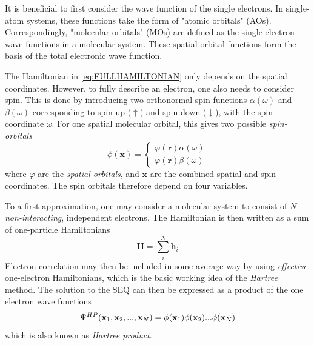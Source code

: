 It is beneficial to first consider the wave function of the single electrons. In single-atom systems, these functions take the form of "atomic orbitals" (AOs). Correspondingly, "molecular orbitals" (MOs) are defined as the single electron wave functions in a molecular system. These spatial orbital functions form the basis of the total electronic wave function.  

The Hamiltonian in \ref{eq:FULLHAMILTONIAN} only depends on the spatial coordinates. However, to fully describe an electron, one also needs to consider spin. This is done by introducing two orthonormal spin functions $\alpha(\omega)$ and $\beta(\omega)$ corresponding to spin-up ($\uparrow$) and spin-down ($\downarrow$), with the spin-coordinate $\omega$. For one spatial molecular orbital, this gives two possible \emph{spin-orbitals}
\begin{equation}
\phi(\mathbf{x}) = \left\lbrace\begin{matrix}
\varphi(\mathbf{r}) \alpha(\omega) \\
\varphi(\mathbf{r}) \beta(\omega)
\end{matrix} \right.
\end{equation}
\noindent where $\varphi$ are the \emph{spatial orbitals}, and $\mathbf{x}$ are the combined spatial and spin coordinates. The spin orbitals therefore depend on four variables.

To a first approximation, one may consider a molecular system to consist of $N$ \emph{non-interacting}, independent electrons. The Hamiltonian is then written as a sum of one-particle Hamiltonians 
\begin{equation}
\mathbf{H} = \sum_i^N \mathbf{h}_i 
\end{equation}
\noindent Electron correlation may then be included in some average way by using \emph{effective} one-electron Hamiltonians, which is the basic working idea of the \emph{Hartree} method. The solution to the SEQ can then be expressed as a product of the one electron wave functions
\begin{equation}
\Psi^{HP}(\mathbf{x}_1,\mathbf{x}_2,...,\mathbf{x}_N) = \phi(\mathbf{x}_1) \phi(\mathbf{x}_2) ... \phi(\mathbf{x}_N)
\end{equation}
\noindent which is also known as \emph{Hartree product}. 

